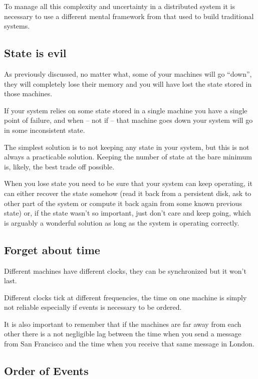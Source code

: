 \documentclass[12pt]{article} %
\begin{document}
To manage all this complexity and uncertainty in a distributed system it is necessary to use a different mental framework from that used to build traditional systems.

	\subsection{State is evil}
	
As previously discussed, no matter what, some of your machines will go ``down'', they will completely lose their memory and you will have lost the state stored in those machines.

If your system relies on some state stored in a single machine you have a single point of failure, and when -- not if -- that machine goes down your system will go in some inconsistent state.

The simplest solution is to not keeping any state in your system, but this is not always a practicable solution. Keeping the number of state at the bare minimum is, likely, the best trade off possible.

When you lose state you need to be sure that your system can keep operating, it can either recover the state somehow (read it back from a persistent disk, ask to other part of the system or compute it back again from some known previous state) or, if the state wasn't so important, just don't care and keep going, which is arguably a wonderful solution as long as the system is operating correctly.

	\subsection{Forget about time}
	
Different machines have different clocks, they can be synchronized but it won't last.

Different clocks tick at different frequencies, the time on one machine is simply not reliable especially if events is necessary to be ordered.

It is also important to remember that if the machines are far away from each other there is a not negligible lag between the time when you send a message from San Francisco and the time when you receive that same message in London. 

	\subsection{Order of Events}
	
\end{document}
